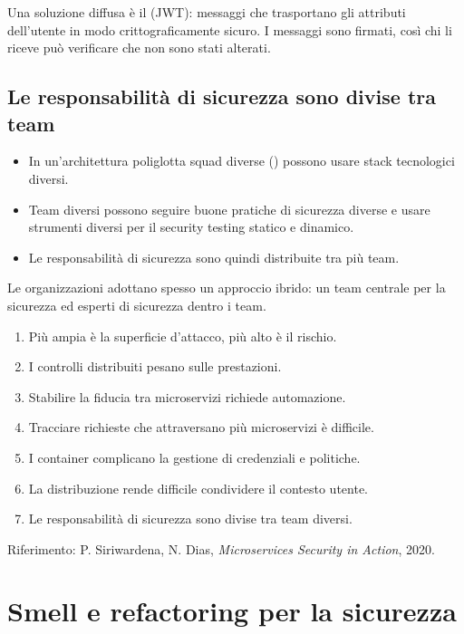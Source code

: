 Una soluzione diffusa è il  (JWT): messaggi che trasportano gli attributi dell'utente in modo
crittograficamente sicuro. I messaggi sono firmati, così chi li riceve può verificare che non sono stati alterati.

\subsection{Le responsabilità di sicurezza sono divise tra team}

\begin{itemize}
  \item In un'architettura poliglotta squad diverse () possono usare stack tecnologici diversi.
  \item Team diversi possono seguire buone pratiche di sicurezza diverse e usare strumenti diversi per il security
    testing statico e dinamico.
  \item Le responsabilità di sicurezza sono quindi distribuite tra più team.
\end{itemize}
Le organizzazioni adottano spesso un approccio ibrido: un team centrale per la sicurezza ed esperti di sicurezza
dentro i team.

\begin{idea}
\begin{enumerate}
  \item Più ampia è la superficie d'attacco, più alto è il rischio.
  \item I controlli distribuiti pesano sulle prestazioni.
  \item Stabilire la fiducia tra microservizi richiede automazione.
  \item Tracciare richieste che attraversano più microservizi è difficile.
  \item I container complicano la gestione di credenziali e politiche.
  \item La distribuzione rende difficile condividere il contesto utente.
  \item Le responsabilità di sicurezza sono divise tra team diversi.
\end{enumerate}
\end{idea}

Riferimento: P. Siriwardena, N. Dias, \emph{Microservices Security in Action}, 2020.

\section{Smell e refactoring per la sicurezza}
\label{sec:secm-smell}

